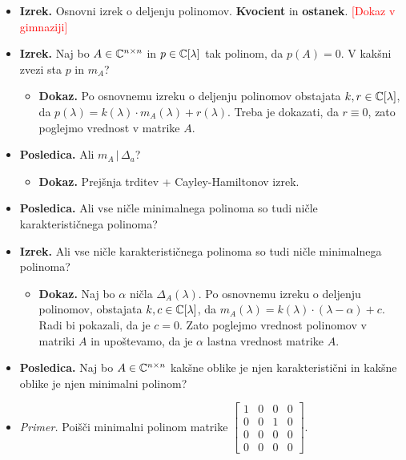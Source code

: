 \begin{enumerate}
\begin{itemize}
        \item \colorbox{blue!30}{\textbf{Izrek.}} Osnovni izrek o deljenju polinomov. \textbf{Kvocient} in \textbf{ostanek}. \textcolor{red}{[Dokaz v gimnaziji]}
        \item \colorbox{blue!30}{\textbf{Izrek.}} Naj bo $A \in \mathbb{C}^{n \times n}$ in $p \in \mathbb{C}[\lambda]$ tak polinom, da $p(A) = 0$. V kakšni zvezi sta $p$ in $m_A$?
        \begin{itemize}
            \item \colorbox{green!30}{\textbf{Dokaz.}} Po osnovnemu izreku o deljenju polinomov obstajata $k, r \in \mathbb{C}[\lambda]$, da $p(\lambda) = k(\lambda) \cdot m_A(\lambda) + r(\lambda)$. Treba je dokazati, da $r \equiv 0$, zato poglejmo vrednost v matrike $A$.
        \end{itemize}
        \item \colorbox{orange!30}{\textbf{Posledica.}} Ali $m_A \, | \, \Delta_a$?
        \begin{itemize}
            \item \colorbox{green!30}{\textbf{Dokaz.}} Prejšnja trditev + Cayley-Hamiltonov izrek.
        \end{itemize}
        \item \colorbox{orange!30}{\textbf{Posledica.}} Ali vse ničle minimalnega polinoma so tudi ničle karakterističnega polinoma?
        \item \colorbox{blue!30}{\textbf{Izrek.}} Ali vse ničle karakterističnega polinoma so tudi ničle minimalnega polinoma?
        \begin{itemize}
            \item \colorbox{green!30}{\textbf{Dokaz.}} Naj bo $\alpha$ ničla $\Delta_A(\lambda)$. Po osnovnemu izreku o deljenju polinomov, obstajata $k, c \in \mathbb{C}[\lambda]$, da $m_A(\lambda) = k(\lambda) \cdot (\lambda - \alpha) + c$. Radi bi pokazali, da je $c = 0$. Zato poglejmo vrednost polinomov v matriki $A$ in upoštevamo, da je $\alpha$ lastna vrednost matrike $A$.
        \end{itemize}
        \item \colorbox{orange!30}{\textbf{Posledica.}} Naj bo $A \in \mathbb{C}^{n \times n}$ kakšne oblike je njen karakteristični in kakšne oblike je njen minimalni polinom?
        \item \colorbox{yellow!30}{\emph{Primer.}} Poišči minimalni polinom matrike $\begin{bmatrix}
            1 & 0 & 0 & 0 \\
            0 & 0 & 1 & 0 \\
            0 & 0 & 0 & 0 \\
            0 & 0 & 0 & 0
        \end{bmatrix}$.
    \end{itemize}


\end{enumerate}
